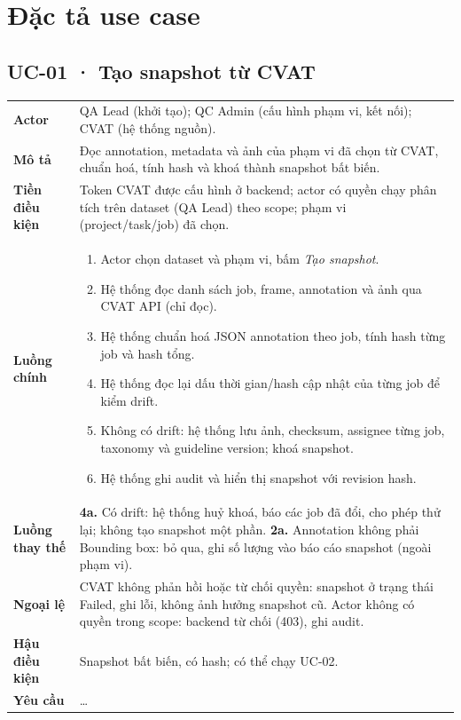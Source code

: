 \section{Đặc tả use case}
\label{sec:ucspec}

\subsection*{UC-01 · Tạo snapshot từ CVAT}
\begin{xltabular}{\linewidth}{@{}>{\bfseries}L{3.2cm}Y@{}}
\toprule
Actor & QA Lead (khởi tạo); QC Admin (cấu hình phạm vi, kết nối); CVAT (hệ thống nguồn).\\
Mô tả & Đọc annotation, metadata và ảnh của phạm vi đã chọn từ CVAT, chuẩn hoá, tính hash và khoá thành snapshot bất biến.\\
Tiền điều kiện & Token CVAT được cấu hình ở backend; actor có quyền chạy phân tích trên dataset (QA Lead) theo scope; phạm vi (project/task/job) đã chọn.\\
Luồng chính &
\begin{enumerate}[nosep]
  \item Actor chọn dataset và phạm vi, bấm \emph{Tạo snapshot}.
  \item Hệ thống đọc danh sách job, frame, annotation và ảnh qua CVAT API (chỉ đọc).
  \item Hệ thống chuẩn hoá JSON annotation theo job, tính hash từng job và hash tổng.
  \item Hệ thống đọc lại dấu thời gian/hash cập nhật của từng job để kiểm drift.
  \item Không có drift: hệ thống lưu ảnh, checksum, assignee từng job, taxonomy và guideline version; khoá snapshot.
  \item Hệ thống ghi audit và hiển thị snapshot với revision hash.
\end{enumerate}\\
Luồng thay thế &
\textbf{4a.} Có drift: hệ thống huỷ khoá, báo các job đã đổi, cho phép thử lại; không tạo snapshot một phần.\newline
\textbf{2a.} Annotation không phải Bounding box: bỏ qua, ghi số lượng vào báo cáo snapshot (ngoài phạm vi).\\
Ngoại lệ & CVAT không phản hồi hoặc từ chối quyền: snapshot ở trạng thái Failed, ghi lỗi, không ảnh hưởng snapshot cũ.\newline
Actor không có quyền trong scope: backend từ chối (403), ghi audit.\\
Hậu điều kiện & Snapshot bất biến, có hash; có thể chạy UC-02.\\
Yêu cầu & …\\
\bottomrule
\end{xltabular}

